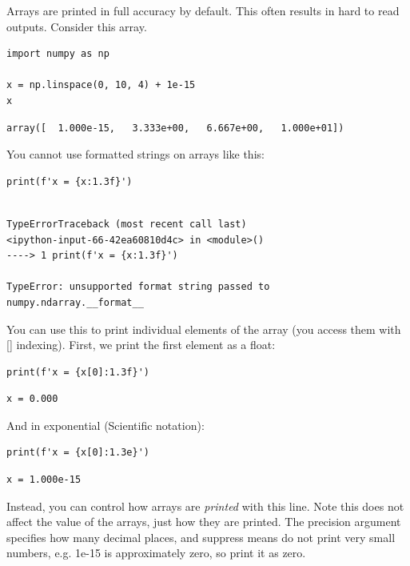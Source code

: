 \documentclass[11pt]{article}
\begin{document}
Arrays are printed in full accuracy by default. This often results in hard to read outputs. Consider this array.

\begin{verbatim}
import numpy as np

x = np.linspace(0, 10, 4) + 1e-15
x
\end{verbatim}

\begin{verbatim}
array([  1.000e-15,   3.333e+00,   6.667e+00,   1.000e+01])
\end{verbatim}

You cannot use formatted strings on arrays like this:

\begin{verbatim}
print(f'x = {x:1.3f}')
\end{verbatim}

\begin{verbatim}

TypeErrorTraceback (most recent call last)
<ipython-input-66-42ea60810d4c> in <module>()
----> 1 print(f'x = {x:1.3f}')

TypeError: unsupported format string passed to numpy.ndarray.__format__
\end{verbatim}

You can use this to print individual elements of the array (you access them with [] indexing). First, we print the first element as a float:

\begin{verbatim}
print(f'x = {x[0]:1.3f}')
\end{verbatim}

\begin{verbatim}
x = 0.000

\end{verbatim}

And in exponential (Scientific notation):

\begin{verbatim}
print(f'x = {x[0]:1.3e}')
\end{verbatim}

\begin{verbatim}
x = 1.000e-15

\end{verbatim}


Instead, you can control how arrays are \emph{printed} with this line. Note this does not affect the value of the arrays, just how they are printed. The precision argument specifies how many decimal places, and suppress means do not print very small numbers, e.g. 1e-15 is approximately zero, so print it as zero.
\end{document}
